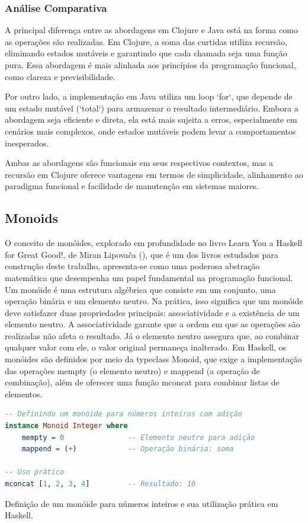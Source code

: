 \subsubsection*{Análise Comparativa}

A principal diferença entre as abordagens em Clojure e Java está na forma como as operações são realizadas. Em Clojure, a soma das curtidas utiliza recursão, eliminando estados mutáveis e garantindo que cada chamada seja uma função pura. Essa abordagem é mais alinhada aos princípios da programação funcional, como clareza e previsibilidade.

Por outro lado, a implementação em Java utiliza um loop `for`, que depende de um estado mutável (`total`) para armazenar o resultado intermediário. Embora a abordagem seja eficiente e direta, ela está mais sujeita a erros, especialmente em cenários mais complexos, onde estados mutáveis podem levar a comportamentos inesperados.

Ambas as abordagens são funcionais em seus respectivos contextos, mas a recursão em Clojure oferece vantagens em termos de simplicidade, alinhamento ao paradigma funcional e facilidade de manutenção em sistemas maiores.

\subsection{Monoids}

O conceito de monóides, explorado em profundidade no livro Learn You a Haskell for Great Good!, de Miran Lipovača (), que é um dos livros estudados para construção deste trabalho, apresenta-se como uma poderosa abstração matemática que desempenha um papel fundamental na programação funcional. Um monóide é uma estrutura algébrica que consiste em um conjunto, uma operação binária e um elemento neutro. Na prática, isso significa que um monóide deve satisfazer duas propriedades principais: associatividade e a existência de um elemento neutro.
A associatividade garante que a ordem em que as operações são realizadas não afeta o resultado. Já o elemento neutro assegura que, ao combinar qualquer valor com ele, o valor original permaneça inalterado. Em Haskell, os monóides são definidos por meio da typeclass Monoid, que exige a implementação das operações mempty (o elemento neutro) e mappend (a operação de combinação), além de oferecer uma função mconcat para combinar listas de elementos.


\begin{tcolorbox}[colback=gray!5!white, colframe=gray!75!black, title={Quadro 14 - Exemplo de Definição e Uso de Monóides em Haskell}]
\begin{lstlisting}[language=Haskell]
-- Definindo um monóide para números inteiros com adição
instance Monoid Integer where
    mempty = 0               -- Elemento neutro para adição
    mappend = (+)            -- Operação binária: soma

-- Uso prático
mconcat [1, 2, 3, 4]         -- Resultado: 10
\end{lstlisting}
\caption{Definição de um monóide para números inteiros e sua utilização prática em Haskell.}
\end{tcolorbox}

